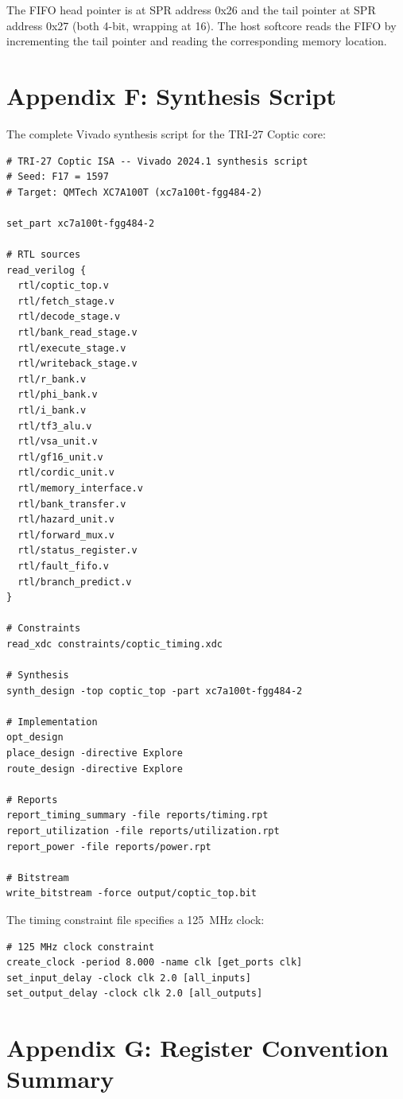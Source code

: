 The FIFO head pointer is at SPR address 0x26 and the tail pointer
at SPR address 0x27 (both 4-bit, wrapping at 16). The host
softcore reads the FIFO by incrementing the tail pointer and
reading the corresponding memory location.

\section{Appendix F: Synthesis Script}\label{fa_71:appx-synthesis}

The complete Vivado synthesis script for the TRI-27 Coptic core:

\begin{verbatim}
# TRI-27 Coptic ISA -- Vivado 2024.1 synthesis script
# Seed: F17 = 1597
# Target: QMTech XC7A100T (xc7a100t-fgg484-2)

set_part xc7a100t-fgg484-2

# RTL sources
read_verilog {
  rtl/coptic_top.v
  rtl/fetch_stage.v
  rtl/decode_stage.v
  rtl/bank_read_stage.v
  rtl/execute_stage.v
  rtl/writeback_stage.v
  rtl/r_bank.v
  rtl/phi_bank.v
  rtl/i_bank.v
  rtl/tf3_alu.v
  rtl/vsa_unit.v
  rtl/gf16_unit.v
  rtl/cordic_unit.v
  rtl/memory_interface.v
  rtl/bank_transfer.v
  rtl/hazard_unit.v
  rtl/forward_mux.v
  rtl/status_register.v
  rtl/fault_fifo.v
  rtl/branch_predict.v
}

# Constraints
read_xdc constraints/coptic_timing.xdc

# Synthesis
synth_design -top coptic_top -part xc7a100t-fgg484-2

# Implementation
opt_design
place_design -directive Explore
route_design -directive Explore

# Reports
report_timing_summary -file reports/timing.rpt
report_utilization -file reports/utilization.rpt
report_power -file reports/power.rpt

# Bitstream
write_bitstream -force output/coptic_top.bit
\end{verbatim}

The timing constraint file specifies a 125~MHz clock:

\begin{verbatim}
# 125 MHz clock constraint
create_clock -period 8.000 -name clk [get_ports clk]
set_input_delay -clock clk 2.0 [all_inputs]
set_output_delay -clock clk 2.0 [all_outputs]
\end{verbatim}

\section{Appendix G: Register Convention Summary}\label{fa_71:appx-convention}

